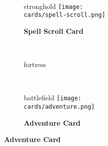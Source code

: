 \vspace*{-4em}
\begin{figure}[H]
  \centering
  \begin{subfigure}[c]{0.22\linewidth}
    \centering
    \caption{\textbf{}}
  \end{subfigure}
  ~
  \begin{subfigure}[c]{0.22\linewidth}
    \begin{expansionmini}{stronghold}
      \centering
      \texttt{[image: \\cards/spell-scroll.png]}
      \caption{\textbf{Spell Scroll Card}}
    \end{expansionmini}
  \end{subfigure}
  ~
  \begin{subfigure}[c]{0.22\linewidth}
    \begin{expansionmini}{fortress}
      \centering
      \caption{\textbf{}}
    \end{expansionmini}
  \end{subfigure}
  ~
  \begin{subfigure}[c]{0.22\linewidth}
    \begin{expansionmini}{battlefield}
      \centering
      \vspace{0.5em}
      \texttt{[image: \\cards/adventure.png]}
      \caption{\textbf{Adventure Card}}
    \end{expansionmini}
  \end{subfigure}
\end{figure}

